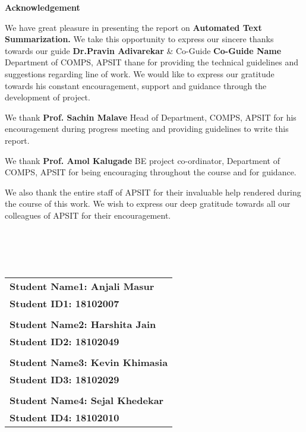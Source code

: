 \newpage
\thispagestyle{empty}
\vspace*{0.2cm}
\vspace{1cm}
\begin{center}
 \large\textbf{Acknowledgement}
\end{center}
\vspace{2cm}
\par 
We have great pleasure in presenting the report on \textbf{Automated Text Summarization.} We take this opportunity to express our sincere thanks towards our guide \textbf{Dr.Pravin Adivarekar} \& Co-Guide \textbf{Co-Guide Name} Department of COMPS, APSIT thane for providing the technical guidelines and suggestions regarding line of work. We would like to express our gratitude towards his constant encouragement, support and guidance through the development of project. 
\par 
We thank \textbf {Prof. Sachin Malave} Head of Department, COMPS, APSIT for his encouragement during progress meeting and providing guidelines to write this report.
\par 
We thank \textbf{Prof. Amol Kalugade}  BE project co-ordinator, Department of COMPS, APSIT for being encouraging throughout the course and for guidance.
\par
We also thank the entire staff of APSIT for their invaluable help rendered during the course of this work. We wish to express our deep gratitude towards all our colleagues of APSIT for their encouragement.
\\
\\
\\
\\
\\
\hfill
\begin{tabular}{@{}l@{}}
\hspace{22 mm} \textbf {Student Name1: Anjali Masur}\\
\hspace{22 mm} \textbf{Student ID1: 18102007} \\
\\
\hspace{22 mm} \textbf {Student Name2: Harshita Jain}\\
\hspace{22 mm} \textbf{Student ID2: 18102049} \\
\\
\hspace{22 mm} \textbf {Student Name3: Kevin Khimasia}\\
\hspace{22 mm} \textbf{Student ID3: 18102029} \\
\\
\hspace{22 mm} \textbf {Student Name4: Sejal Khedekar}\\
\hspace{22 mm} \textbf{Student ID4: 18102010} \\
\end{tabular}

\newpage